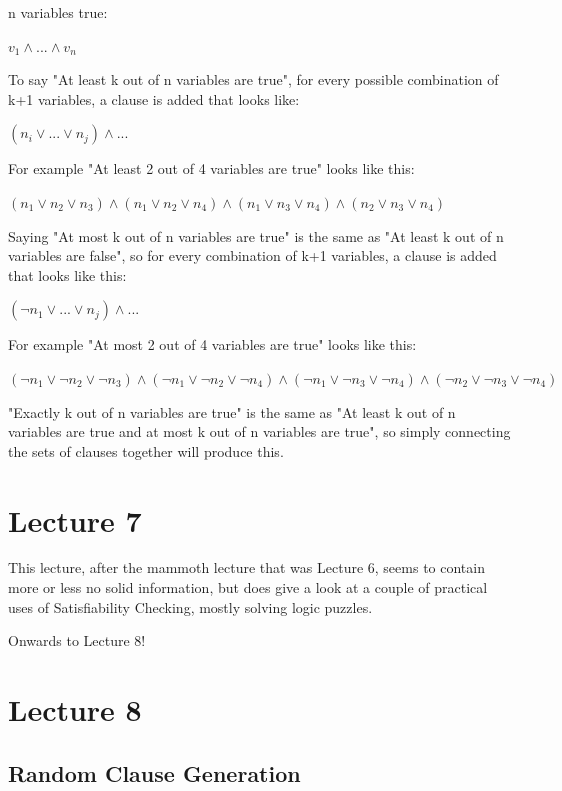 \documentclass[11pt,a4paper]{article}
\begin{document}
\vspace{5pt}
n variables true:

$v_1 \wedge ... \wedge v_n$

\vspace{5pt}
To say "At least k out of n variables are true", for every possible combination of k+1 variables, a clause is added that looks like:

$(n_i \vee ... \vee n_j) \wedge ... $

For example "At least 2 out of 4 variables are true" looks like this:

$(n_1 \vee n_2 \vee n_3) \wedge (n_1 \vee n_2 \vee n_4) \wedge (n_1 \vee n_3 \vee n_4) \wedge (n_2 \vee n_3 \vee n_4)$

\vspace{5pt}
Saying "At most k out of n variables are true" is the same as "At least k out of n variables are false", so for every combination of k+1 variables, a clause is added that looks like this:

$(\neg n_1 \vee ... \vee n_j) \wedge ... $

For example "At most 2 out of 4 variables are true" looks like this:

$(\neg n_1 \vee \neg n_2 \vee \neg n_3) \wedge (\neg n_1 \vee \neg n_2 \vee \neg n_4) \wedge (\neg n_1 \vee \neg n_3 \vee \neg n_4) \wedge (\neg n_2 \vee \neg n_3 \vee \neg n_4)$

\vspace{5pt}
"Exactly k out of n variables are true" is the same as "At least k out of n variables are true and at most k out of n variables are true", so simply connecting the sets of clauses together will produce this.

\section{Lecture 7}

This lecture, after the mammoth lecture that was Lecture 6, seems to contain more or less no solid information, but does give a look at a couple of practical uses of Satisfiability Checking, mostly solving logic puzzles.

Onwards to Lecture 8!

\section{Lecture 8}

\subsection{Random Clause Generation}
\end{document}
